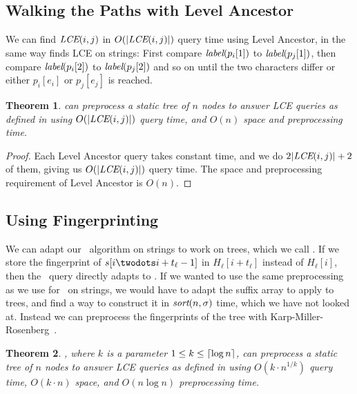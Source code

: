 \documentclass[a4]{article}
\newcommand*{\pref}{\prettyref}
\newtheorem{theorem}{Theorem}
\begin{document}
\subsection{Walking the Paths with Level Ancestor\label{sec:tree-dc}}

We can find $\textit{LCE}(i,j)$ in $O(|\textit{LCE}(i,j)|)$ query time using Level Ancestor, in the same way  finds LCE on strings: First compare $\textit{label}(p_i[1])$ to $\textit{label}(p_j[1])$, then compare $\textit{label}(p_i[2])$ to $\textit{label}(p_j[2])$ and so on until the two characters differ or either $p_i[e_i]$ or $p_j[e_j]$ is reached.

\begin{theorem}
 can preprocess a static tree of $n$ nodes to answer LCE queries as defined in \pref{sec:tree-def} using $O(|\textit{LCE}(i,j)|)$ query time, and $O(n)$ space and preprocessing time.
\end{theorem}
\begin{proof}
Each Level Ancestor query takes constant time, and we do $2|\textit{LCE}(i,j)| + 2$ of them, giving us $O(|\textit{LCE}(i,j)|)$ query time. The space and preprocessing requirement of Level Ancestor is $O(n)$.
\end{proof}

\subsection{Using Fingerprinting}

We can adapt our \fprintk\ algorithm on strings to work on trees, which we call \tfprintk. If we store the fingerprint of $s[i\twodots i+t_\ell-1]$ in $H_\ell[i+t_\ell]$ instead of $H_\ell[i]$, then the \fprintk\ query directly adapts to \tfprintk. If we wanted to use the same preprocessing as we use for \fprintk\ on strings, we would have to adapt the suffix array to apply to trees, and find a way to construct it in $\textit{sort}(n,\sigma)$ time, which we have not looked at. Instead we can preprocess the fingerprints of the tree with Karp-Miller-Rosenberg~\cite{karp-miller-rosenberg}.

\begin{theorem}
\tfprintk, where $k$ is a parameter $1\leq k\leq\lceil\log n\rceil$, can preprocess a static tree of $n$ nodes to answer LCE queries as defined in \pref{sec:tree-def} using $O(k\cdot n^{1/k})$ query time, $O(k\cdot n)$ space, and $O(n\log n)$ preprocessing time.
\end{theorem}
\end{document}
